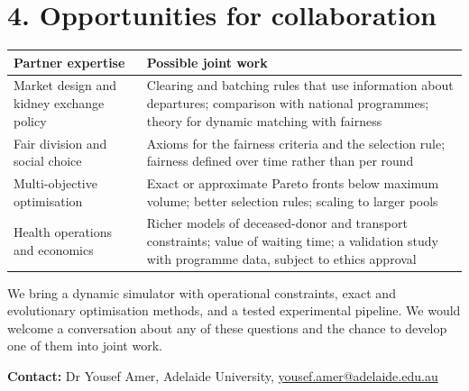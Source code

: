 \documentclass[10pt]{article}
\begin{document}
\section*{4. Opportunities for collaboration}
\begin{center}
\small
\begin{tabularx}{\textwidth}{@{}p{4.2cm}L@{}}
\toprule
Partner expertise & Possible joint work \\
\midrule
Market design and kidney exchange policy
  & Clearing and batching rules that use information about departures; comparison with
    national programmes; theory for dynamic matching with fairness \\
Fair division and social choice
  & Axioms for the fairness criteria and the selection rule; fairness defined over time
    rather than per round \\
Multi-objective optimisation
  & Exact or approximate Pareto fronts below maximum volume; better selection rules;
    scaling to larger pools \\
Health operations and economics
  & Richer models of deceased-donor and transport constraints; value of waiting time;
    a validation study with programme data, subject to ethics approval \\
\bottomrule
\end{tabularx}
\end{center}

We bring a dynamic simulator with operational constraints, exact and evolutionary
optimisation methods, and a tested experimental pipeline. We would welcome a
conversation about any of these questions and the chance to develop one of them into
joint work.

\textbf{Contact:} Dr Yousef Amer, Adelaide University,
\href{mailto:yousef.amer@adelaide.edu.au}{yousef.amer@adelaide.edu.au}
\end{document}
